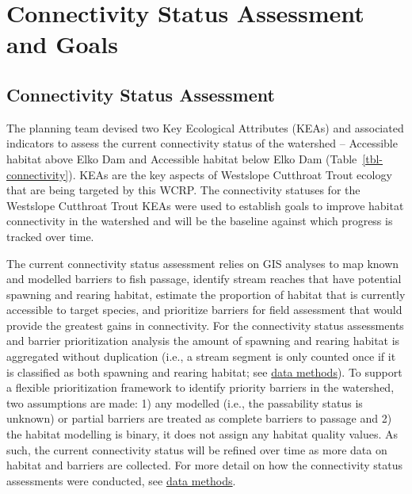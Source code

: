 \documentclass[
  letterpaper,
  DIV=11,
  numbers=noendperiod]{scrreprt}
\begin{document}

\chapter*{Connectivity Status Assessment and
Goals}\label{connectivity-status-assessment-and-goals}


\section*{Connectivity Status
Assessment}\label{connectivity-status-assessment}


The planning team devised two Key Ecological Attributes (KEAs) and
associated indicators to assess the current connectivity status of the
watershed -- Accessible habitat above Elko Dam and Accessible habitat
below Elko Dam (Table~\ref{tbl-connectivity}). KEAs are the key aspects
of Westslope Cutthroat Trout ecology that are being targeted by this
WCRP. The connectivity statuses for the Westslope Cutthroat Trout KEAs
were used to establish goals to improve habitat connectivity in the
watershed and will be the baseline against which progress is tracked
over time.

The current connectivity status assessment relies on GIS analyses to map
known and modelled barriers to fish passage, identify stream reaches
that have potential spawning and rearing habitat, estimate the
proportion of habitat that is currently accessible to target species,
and prioritize barriers for field assessment that would provide the
greatest gains in connectivity. For the connectivity status assessments
and barrier prioritization analysis the amount of spawning and rearing
habitat is aggregated without duplication (i.e., a stream segment is
only counted once if it is classified as both spawning and rearing
habitat; see \href{data-methods.qmd}{data methods}). To support a
flexible prioritization framework to identify priority barriers in the
watershed, two assumptions are made: 1) any modelled (i.e., the
passability status is unknown) or partial barriers are treated as
complete barriers to passage and 2) the habitat modelling is binary, it
does not assign any habitat quality values. As such, the current
connectivity status will be refined over time as more data on habitat
and barriers are collected. For more detail on how the connectivity
status assessments were conducted, see \href{data-methods.qmd}{data
methods}.
\end{document}
